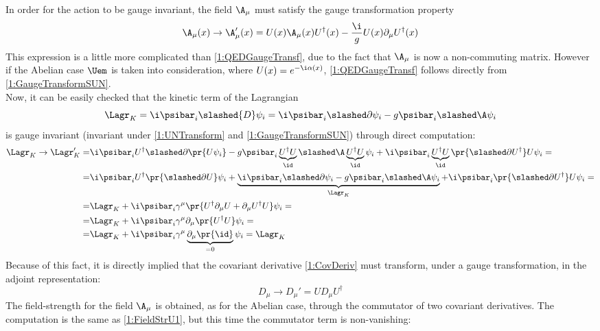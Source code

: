 In order for the action to be gauge invariant, the field $\A_\mu$ must satisfy the gauge transformation property
\begin{equation}
    \A_\mu(x) \rightarrow \A_\mu'(x) = U(x)\A_\mu(x)U^\dagger(x) - \frac{\i}{g}U(x)\partial_\mu U^\dagger(x) \label{1:GaugeTransformSUN}
\end{equation}
This expression is a little more complicated than \eqref{1:QEDGaugeTransf}, due to the fact that $\A_\mu$ is now a non-commuting matrix. However if the Abelian case $\Uem$ is taken into consideration, where $U(x)=e^{-\i\alpha(x)}$, \eqref{1:QEDGaugeTransf} follows directly from \eqref{1:GaugeTransformSUN}.\\
Now, it can be easily checked that the kinetic term of the Lagrangian
\begin{equation*}
    \Lagr_K = \i\psibar_i\slashed{D}\psi_i = \i\psibar_i\slashed\partial\psi_i -g\psibar_i\slashed\A\psi_i
\end{equation*}
is gauge invariant (\ie invariant under \eqref{1:UNTransform} and \eqref{1:GaugeTransformSUN}) through direct computation:
\begin{align*}
    \Lagr_K \rightarrow \Lagr_K' =& \i\psibar_i U^\dagger\slashed\partial\pr{U\psi_i} -g\psibar_i\underbrace{U^\dagger U}_{\id}\slashed\A\underbrace{U^\dagger U}_{\id}\psi_i +\i\psibar_i\underbrace{U^\dagger U}_{\id}\pr{\slashed\partial U^\dagger}U\psi_i= \\
    =& \i\psibar_i U^\dagger\pr{\slashed\partial U}\psi_i +\underbrace{\i\psibar_i\slashed\partial\psi_i -g\psibar_i\slashed\A\psi_i}_{\Lagr_K} +\i\psibar_i\pr{\slashed\partial U^\dagger}U\psi_i= \\
    =& \Lagr_K +\i\psibar_i\gamma^\mu\pr{U^\dagger\partial_\mu U+ \partial_\mu U^\dagger U}\psi_i= \\
    =& \Lagr_K +\i\psibar_i\gamma^\mu\partial_\mu\pr{U^\dagger U}\psi_i= \\
    =& \Lagr_K +\i\psibar_i\gamma^\mu\underbrace{\partial_\mu\pr{\id}}_{=0}\psi_i = \Lagr_K
\end{align*}
Because of this fact, it is directly implied that the covariant derivative \eqref{1:CovDeriv} must transform, under a gauge transformation, in the adjoint representation:
\begin{equation}
    D_\mu \rightarrow D_\mu' = U D_\mu U^\dagger \label{1:GaugeTrCovDer}
\end{equation}
The field-strength for the field $\A_\mu$ is obtained, as for the Abelian case, through the commutator of two covariant derivatives. The computation is the same as \eqref{1:FieldStrU1}, but this time the commutator term is non-vanishing:
